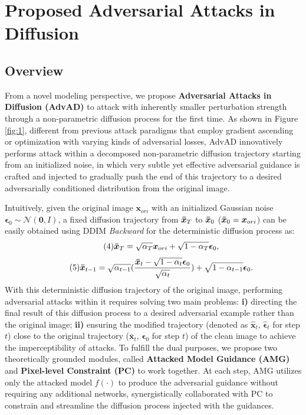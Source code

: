 \documentclass{article}
\begin{document}
\section{Proposed Adversarial Attacks in Diffusion}
\subsection{Overview} 
From a novel modeling perspective, we propose \textbf{Adversarial Attacks in Diffusion (AdvAD)} to attack with inherently smaller perturbation strength through a non-parametric diffusion process for the first time. As shown in Figure \ref{fig:1}, different from previous attack paradigms {that employ gradient ascending or optimization with varying kinds of adversarial losses,}  
{AdvAD innovatively performs attack within a decomposed non-parametric diffusion trajectory starting from an initialized noise, in which very subtle yet effective adversarial guidance is crafted and injected to gradually push the end of this trajectory to a desired adversarially conditioned distribution from the original image.} 

Intuitively, given the original image $\boldsymbol{x}_{ori}$ with an initialized Gaussian noise $\boldsymbol{\epsilon}_0 \sim \mathcal{N}(\boldsymbol{0}, \boldsymbol{\mathit{I}})$, a fixed diffusion trajectory from $\boldsymbol{\Bar{x}}_{T}$ to $\boldsymbol{\Bar{x}}_{0}$ ($\boldsymbol{\Bar{x}}_{0}=\boldsymbol{x}_{ori}$) can be easily obtained using DDIM \textit{Backward} for the deterministic diffusion process as:
\begin{equation}\tag{4}
    \boldsymbol{\Bar{x}}_T = \sqrt{\alpha_T}\boldsymbol{x}_{ori} + \sqrt{1-\alpha_T}\boldsymbol{\epsilon}_0,
\label{maineq:4}
\end{equation}
\begin{equation}\tag{5}
    \boldsymbol{\Bar{x}}_{t-1} = \sqrt{\alpha_{t-1}}(\frac{\boldsymbol{\Bar{x}}_t-\sqrt{1-\alpha_t}\boldsymbol{\epsilon}_0}{\sqrt{\alpha_t}}) + \sqrt{1-\alpha_{t-1}}\boldsymbol{\epsilon}_0.
\label{maineq:5}
\end{equation}
With this deterministic diffusion trajectory of the original image, performing adversarial attacks within it requires solving two main problems: \textbf{i)} directing the final result of this diffusion process to a desired adversarial example rather than the original image; \textbf{ii)} ensuring the modified trajectory (denoted as $\boldsymbol{\hat{x}}_t$, $\boldsymbol{\hat{\epsilon}}_t$ for step $t$) close to the original trajectory ($\boldsymbol{\bar{x}}_t$, $\boldsymbol{{\epsilon}}_0$ for step $t$) of the clean image to achieve the imperceptibility of attacks. To fulfill the dual purposes, we propose two theoretically grounded modules, called \textbf{Attacked Model Guidance (AMG)} and \textbf{Pixel-level Constraint (PC)} to work together. At each step, AMG utilizes only the attacked model $f(\cdot)$ to produce the adversarial guidance without requiring any additional networks, synergistically collaborated with PC to constrain and streamline the diffusion process injected with the guidances.
\end{document}
